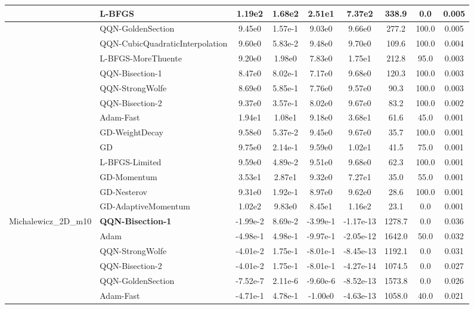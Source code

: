 \documentclass{article}
\begin{document}
\begin{longtable}{|l|l|c|c|c|c|c|c|c|}
\hline
 & L-BFGS & 1.19e2 & 1.68e2 & 2.51e1 & 7.37e2 & 338.9 & 0.0 & 0.005 \\
\hline
 & QQN-GoldenSection & 9.45e0 & 1.57e-1 & 9.03e0 & 9.66e0 & 277.2 & 100.0 & 0.005 \\
\hline
 & QQN-CubicQuadraticInterpolation & 9.60e0 & 5.83e-2 & 9.48e0 & 9.70e0 & 109.6 & 100.0 & 0.004 \\
\hline
 & L-BFGS-MoreThuente & 9.20e0 & 1.98e0 & 7.83e0 & 1.75e1 & 212.8 & 95.0 & 0.003 \\
\hline
 & QQN-Bisection-1 & 8.47e0 & 8.02e-1 & 7.17e0 & 9.68e0 & 120.3 & 100.0 & 0.003 \\
\hline
 & QQN-StrongWolfe & 8.69e0 & 5.85e-1 & 7.76e0 & 9.57e0 & 90.3 & 100.0 & 0.003 \\
\hline
 & QQN-Bisection-2 & 9.37e0 & 3.57e-1 & 8.02e0 & 9.67e0 & 83.2 & 100.0 & 0.002 \\
\hline
 & Adam-Fast & 1.94e1 & 1.08e1 & 9.18e0 & 3.68e1 & 61.6 & 45.0 & 0.001 \\
\hline
 & GD-WeightDecay & 9.58e0 & 5.37e-2 & 9.45e0 & 9.67e0 & 35.7 & 100.0 & 0.001 \\
\hline
 & GD & 9.75e0 & 2.14e-1 & 9.59e0 & 1.02e1 & 41.5 & 75.0 & 0.001 \\
\hline
 & L-BFGS-Limited & 9.59e0 & 4.89e-2 & 9.51e0 & 9.68e0 & 62.3 & 100.0 & 0.001 \\
\hline
 & GD-Momentum & 3.53e1 & 2.87e1 & 9.32e0 & 7.27e1 & 35.0 & 55.0 & 0.001 \\
\hline
 & GD-Nesterov & 9.31e0 & 1.92e-1 & 8.97e0 & 9.62e0 & 28.6 & 100.0 & 0.001 \\
\hline
 & GD-AdaptiveMomentum & 1.02e2 & 9.83e0 & 8.45e1 & 1.16e2 & 23.1 & 0.0 & 0.001 \\
Michalewicz\_2D\_m10 & \textbf{QQN-Bisection-1} & -1.99e-2 & 8.69e-2 & -3.99e-1 & -1.17e-13 & 1278.7 & 0.0 & 0.036 \\
\hline
 & Adam & -4.98e-1 & 4.98e-1 & -9.97e-1 & -2.05e-12 & 1642.0 & 50.0 & 0.032 \\
\hline
 & QQN-StrongWolfe & -4.01e-2 & 1.75e-1 & -8.01e-1 & -8.45e-13 & 1192.1 & 0.0 & 0.031 \\
\hline
 & QQN-Bisection-2 & -4.01e-2 & 1.75e-1 & -8.01e-1 & -4.27e-14 & 1074.5 & 0.0 & 0.027 \\
\hline
 & QQN-GoldenSection & -7.52e-7 & 2.11e-6 & -9.60e-6 & -8.52e-13 & 1573.8 & 0.0 & 0.026 \\
\hline
 & Adam-Fast & -4.71e-1 & 4.78e-1 & -1.00e0 & -4.63e-13 & 1058.0 & 40.0 & 0.021 \\

\end{longtable}
\end{document}
